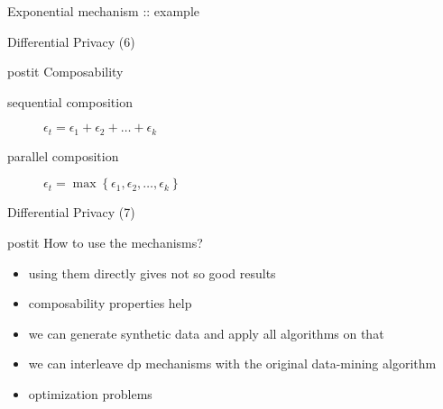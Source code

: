 \documentclass{beamer}
\begin{document}
\begin{frame}{Exponential mechanism :: example}
  \begin{center}
  \end{center}
\end{frame}

\begin{frame}{Differential Privacy (6)}
  \begin{beamercolorbox}[wd=\textwidth,rounded=true,shadow=true]{postit}
    Composability
  \end{beamercolorbox}
  \pause
  \begin{description}
    \item[sequential composition] $\epsilon_t = \epsilon_1 + \epsilon_2 + \ldots + \epsilon_k$
    \item[parallel composition] $\epsilon_t = \max\left\{\epsilon_1,\epsilon_2,\ldots,\epsilon_k\right\}$
  \end{description}
\end{frame}

\begin{frame}{Differential Privacy (7)}
  \begin{beamercolorbox}[wd=\textwidth,rounded=true,shadow=true]{postit}
    How to use the mechanisms?
  \end{beamercolorbox}
  \pause
  \begin{itemize}
    \item using them directly gives not so good results
    \item composability properties help
    \item we can generate synthetic data and apply all algorithms on that
    \item we can interleave dp mechanisms with the original data-mining
      algorithm
    \item optimization problems
  \end{itemize}
\end{frame}
\end{document}
